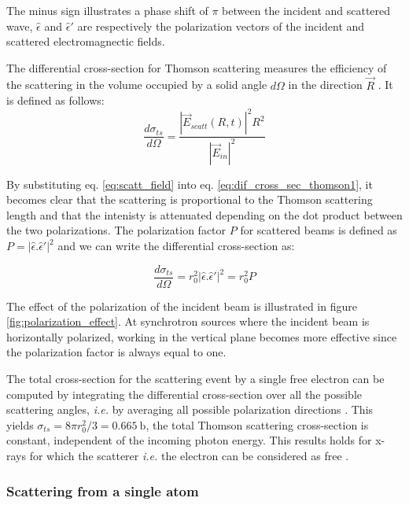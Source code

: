 The minus sign illustrates a phase shift of $\pi$ between the incident and scattered wave, $\hat{\epsilon}$ and $\hat{\epsilon}'$ are respectively the polarization vectors of the incident and scattered electromagnectic fields.

The differential cross-section for Thomson scattering measures the efficiency of the scattering in the volume occupied by a solid angle $d\Omega$ in the direction $\vec{R}$ \parencite{NielsenMcMorrow}. It is defined as follows:
\begin{equation}
    \label{eq:dif_cross_sec_thomson1}
    \frac{d\sigma_{ts}} {d \Omega} = \frac{ |\vec{E}_{scatt}(R, t)|^2 R^2} {|\vec{E}_{in}|^2}
\end{equation}

By substituting eq. \ref{eq:scatt_field} into eq. \ref{eq:dif_cross_sec_thomson1}, it becomes clear that the scattering is proportional to the Thomson scattering length and that the intenisty is attenuated depending on the dot product between the two polarizations.
The polarization factor $P$ for scattered beams is defined as $P =  | \hat{\epsilon}.\hat{\epsilon}'|^2$ and we can write the differential cross-section as:

\begin{equation}
    \frac{d\sigma_{ts}} {d \Omega} = r_0^2 | \hat{\epsilon}.\hat{\epsilon}'|^2 = r_0^2 P
\end{equation}

The effect of the polarization of the incident beam is illustrated in figure \ref{fig:polarization_effect}.
At synchrotron sources where the incident beam is horizontally polarized, working in the vertical plane becomes more effective since the polarization factor is always equal to one.

The total cross-section for the scattering event by a single free electron can be computed by integrating the differential cross-section over all the possible scattering angles, \textit{i.e.} by averaging all possible polarization directions \parencite{Willmott}.
This yields $\sigma_{ts} = 8 \pi r_0^2 /3 = 0.665 \:\si{\barn}$, the total Thomson scattering cross-section is constant, independent of the incoming photon energy. This results holds for x-rays for which the scatterer \textit{i.e.} the electron can be considered as free \parencite{Willmott}.

\subsubsection{Scattering from a single atom}

